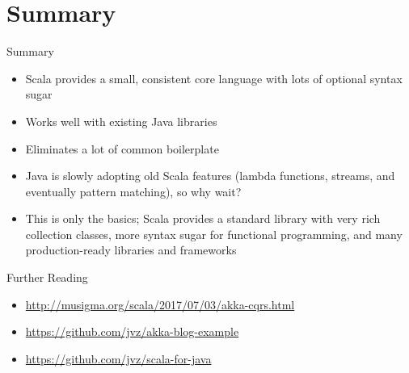 \documentclass{beamer}
\begin{document}
\section*{Summary}

\begin{frame}{Summary}
\begin{itemize}
\item Scala provides a small, consistent core language with lots of optional
syntax sugar
\item Works well with existing Java libraries
\item Eliminates a lot of common boilerplate
\item Java is slowly adopting old Scala features (lambda functions, streams, and
eventually pattern matching), so why wait?
\item This is only the basics; Scala provides a standard library with very rich
collection classes, more syntax sugar for functional programming, and many
production-ready libraries and frameworks
\end{itemize}
\end{frame}

\begin{frame}{Further Reading}
\begin{itemize}
\item \url{http://musigma.org/scala/2017/07/03/akka-cqrs.html}
\item \url{https://github.com/jvz/akka-blog-example}
\item \url{https://github.com/jvz/scala-for-java}
\end{itemize}
\end{frame}
\end{document}
